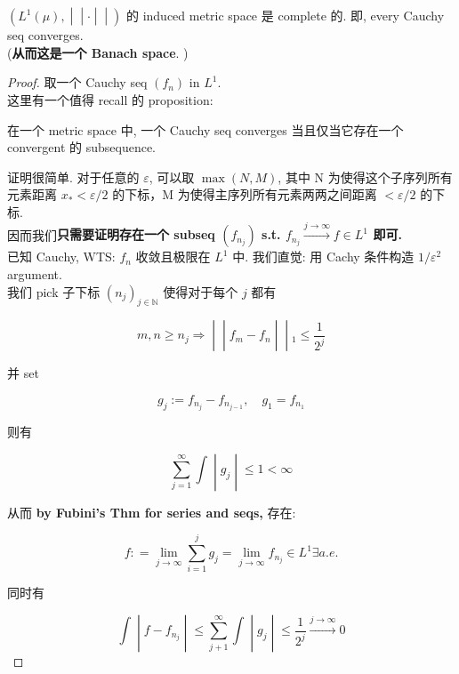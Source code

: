 \begin{corollary}{}

\(\left. (L^{1}(\mu), \middle| \middle| \cdot \middle| \middle| ) \right.\) 的 induced metric space 是 complete 的. 即, every Cauchy seq converges.\\
(\textbf{从而这是一个 Banach space}. )

\end{corollary}

\begin{proof}

取一个 Cauchy seq \((f_{n})\) in \(L^{1}\).\\
这里有一个值得 recall 的 proposition:

\begin{proposition}

在一个 metric space 中, 一个 Cauchy seq converges 当且仅当它存在一个 convergent 的 subsequence.

\end{proposition}

证明很简单. 对于任意的 \(\varepsilon\), 可以取 \(\max(N,M)\), 其中 N 为使得这个子序列所有元素距离 \(x_{\ast} < \varepsilon/2\) 的下标，M 为使得主序列所有元素两两之间距离 \(< \varepsilon/2\) 的下标.\\
因而我们\textbf{只需要证明存在一个 subseq \((f_{n_{j}})\) s.t. \(f_{n_{j}}\overset{j\rightarrow\infty}{\rightarrow}f \in L^{1}\) 即可.}\\
已知 Cauchy, WTS: \(f_{n}\) 收敛且极限在 \(L^{1}\) 中. 我们直觉: 用 Cachy 条件构造 \(1/\varepsilon^{2}\) argument.\\
我们 pick 子下标 \((n_{j})_{j \in \mathbb{N}}\) 使得对于每个 \(j\) 都有

\[\left. m,n \geq n_{j}\Longrightarrow \middle| \middle| f_{m} - f_{n} \middle| \middle| {}_{1} \leq \frac{1}{2^{j}} \right.\]

并 set

\[g_{j} := f_{n_{j}} - f_{n_{j - 1}},\quad g_{1} = f_{n_{1}}\]

则有

\[\left. \sum\limits_{j = 1}^{\infty}\int \middle| g_{j} \middle| \leq 1 < \infty \right.\]

从而 \textbf{by Fubini's Thm for series and seqs,} 存在:

\[f: = \lim\limits_{j\rightarrow\infty}\sum\limits_{i = 1}^{j}g_{j} = \lim\limits_{j\rightarrow\infty}f_{n_{j}} \in L^{1}\exists a.e.\]

同时有

\[\left. \int \middle| f - f_{n_{j}} \middle| \leq \sum\limits_{j + 1}^{\infty}\int \middle| g_{j} \middle| \leq \frac{1}{2^{j}}\overset{j\rightarrow\infty}{\rightarrow}0 \right.\]

\end{proof}


